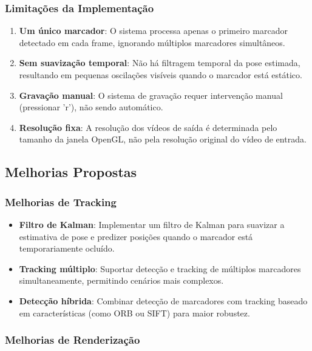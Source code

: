 \subsubsection{Limitações da Implementação}

\begin{enumerate}
    \item \textbf{Um único marcador}: O sistema processa apenas o primeiro marcador detectado em cada frame, ignorando múltiplos marcadores simultâneos.
    
    \item \textbf{Sem suavização temporal}: Não há filtragem temporal da pose estimada, resultando em pequenas oscilações visíveis quando o marcador está estático.
    
    \item \textbf{Gravação manual}: O sistema de gravação requer intervenção manual (pressionar 'r'), não sendo automático.
    
    \item \textbf{Resolução fixa}: A resolução dos vídeos de saída é determinada pelo tamanho da janela OpenGL, não pela resolução original do vídeo de entrada.
\end{enumerate}

\subsection{Melhorias Propostas}

\subsubsection{Melhorias de Tracking}

\begin{itemize}
    \item \textbf{Filtro de Kalman}: Implementar um filtro de Kalman para suavizar a estimativa de pose e predizer posições quando o marcador está temporariamente ocluído.
    
    \item \textbf{Tracking múltiplo}: Suportar detecção e tracking de múltiplos marcadores simultaneamente, permitindo cenários mais complexos.
    
    \item \textbf{Detecção híbrida}: Combinar detecção de marcadores com tracking baseado em características (como ORB ou SIFT) para maior robustez.
\end{itemize}

\subsubsection{Melhorias de Renderização}

